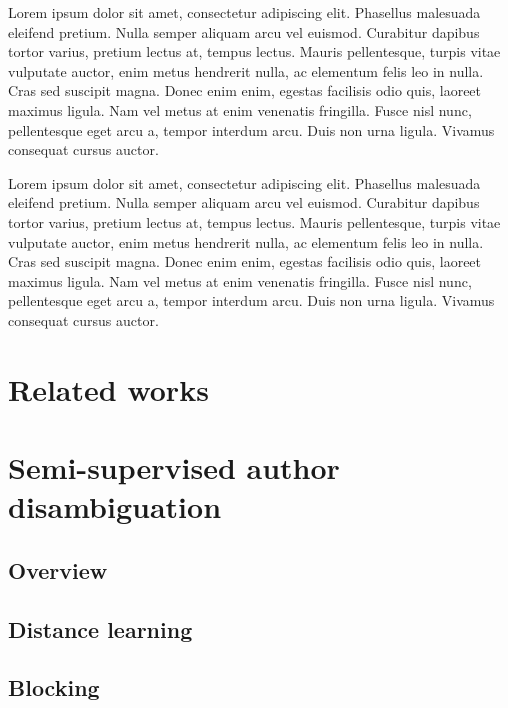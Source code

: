 \documentclass{article}
\begin{document}
Lorem ipsum dolor sit amet, consectetur adipiscing elit. Phasellus malesuada
eleifend pretium. Nulla semper aliquam arcu vel euismod. Curabitur dapibus
tortor varius, pretium lectus at, tempus lectus. Mauris pellentesque, turpis
vitae vulputate auctor, enim metus hendrerit nulla, ac elementum felis leo in
nulla. Cras sed suscipit magna. Donec enim enim, egestas facilisis odio quis,
laoreet maximus ligula. Nam vel metus at enim venenatis fringilla. Fusce nisl
nunc, pellentesque eget arcu a, tempor interdum arcu. Duis non urna ligula.
Vivamus consequat cursus auctor.

Lorem ipsum dolor sit amet, consectetur adipiscing elit. Phasellus malesuada
eleifend pretium. Nulla semper aliquam arcu vel euismod. Curabitur dapibus
tortor varius, pretium lectus at, tempus lectus. Mauris pellentesque, turpis
vitae vulputate auctor, enim metus hendrerit nulla, ac elementum felis leo in
nulla. Cras sed suscipit magna. Donec enim enim, egestas facilisis odio quis,
laoreet maximus ligula. Nam vel metus at enim venenatis fringilla. Fusce nisl
nunc, pellentesque eget arcu a, tempor interdum arcu. Duis non urna ligula.
Vivamus consequat cursus auctor.



\section{Related works}
\label{relate-works}



\section{Semi-supervised author disambiguation}
\label{methods}

\subsection{Overview}

\subsection{Distance learning}

\subsection{Blocking}
\end{document}
